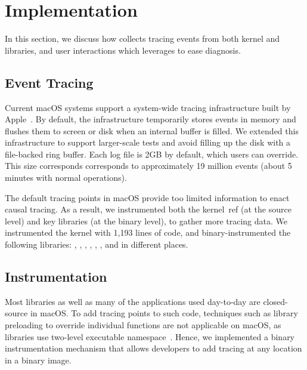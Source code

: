 \section{Implementation}\label{sec:implementation}

In this section, we discuss how \xxx collects tracing events from both kernel
and libraries, and user interactions which \xxx leverages to ease diagnosis.

\subsection{Event Tracing}

Current macOS systems support a system-wide tracing infrastructure built by
Apple~\cite{linktotracetool}. By default, the infrastructure temporarily stores
events in memory and flushes them to screen or disk when an internal buffer
is filled. We extended this infrastructure to support larger-scale tests and
avoid filling up the disk with a file-backed ring buffer. Each log file is 2GB
by default, which users can override. This size corresponds corresponds to
approximately 19 million events (about 5 minutes with normal operations).

The default tracing points in macOS provide too limited information
to enact causal tracing. As a result, we instrumented both the
kernel~ref\cite{linkofxnusourcecode} (at the source level) and key libraries
(at the binary level), to gather more tracing data. We instrumented the kernel
with 1,193 lines of code, and binary-instrumented the following libraries:
, , ,
, , ,  and
 in \nlibchanges different places.



\subsection{Instrumentation}

Most libraries as well as many of the applications used day-to-day are
closed-source in macOS. To add tracing points to such code, techniques such as
library preloading to override individual functions are not applicable on macOS,
as libraries use two-level executable namespace~\cite{twolayernamespace}. Hence,
we implemented a binary instrumentation mechanism that allows developers to add
tracing at any location in a binary image.

